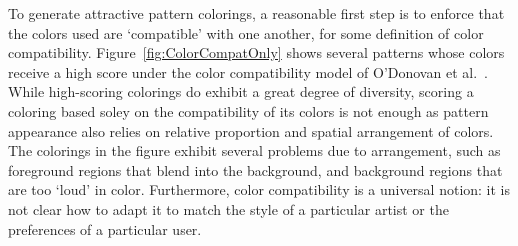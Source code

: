 To generate attractive pattern colorings, a reasonable first step is to enforce that the colors used are `compatible' with one another, for some definition of color compatibility. Figure~\ref{fig:ColorCompatOnly} shows several patterns whose colors receive a high score under the color compatibility model of O'Donovan et al.~. While high-scoring colorings do exhibit a great degree of diversity, scoring a coloring based soley on the compatibility of its colors is not enough as pattern appearance also relies on relative proportion and spatial arrangement of colors. The colorings in the figure exhibit several problems due to arrangement, such as foreground regions that blend into the background, and background regions that are too `loud' in color. Furthermore, color compatibility is a universal notion: it is not clear how to adapt it to match the style of a particular artist or the preferences of a particular user.



